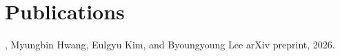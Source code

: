 \section{Publications}

\begin{itemize}
      {\me, Myungbin Hwang, Eulgyu Kim, and Byoungyoung Lee}
      {arXiv preprint, 2026.}
\end{itemize}
